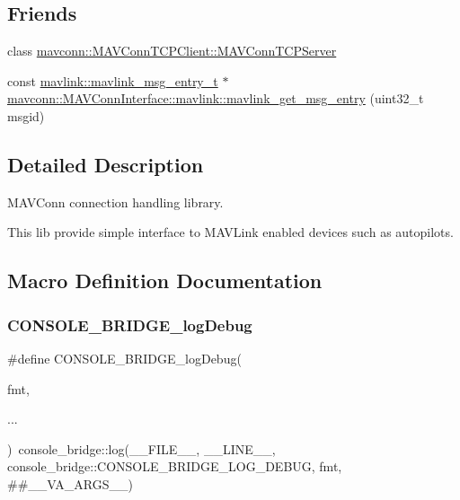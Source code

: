 \subsection*{Friends}
\begin{DoxyCompactItemize}
\item 
class \mbox{\hyperlink{group__mavconn_gaa93ce54993292c6350cf74aa47fde6cd}{mavconn\+::\+M\+A\+V\+Conn\+T\+C\+P\+Client\+::\+M\+A\+V\+Conn\+T\+C\+P\+Server}}
\item 
const \mbox{\hyperlink{include__v2_80_2mavlink__types_8h_abf009bf897407a543e5209298ad82321}{mavlink\+::mavlink\+\_\+msg\+\_\+entry\+\_\+t}} $\ast$ \mbox{\hyperlink{group__mavconn_gabc1b20a1cf82d2e9d432f0a5ac140630}{mavconn\+::\+M\+A\+V\+Conn\+Interface\+::mavlink\+::mavlink\+\_\+get\+\_\+msg\+\_\+entry}} (uint32\+\_\+t msgid)
\end{DoxyCompactItemize}


\subsection{Detailed Description}
M\+A\+V\+Conn connection handling library. 

This lib provide simple interface to M\+A\+V\+Link enabled devices such as autopilots. 

\subsection{Macro Definition Documentation}
\mbox{\label{group__mavconn_gaaf4116dec671bee3f8f1445f6c6a3ebe}} 
\subsubsection{\texorpdfstring{CONSOLE\_BRIDGE\_logDebug}{CONSOLE\_BRIDGE\_logDebug}}
{\footnotesize\ttfamily \#define C\+O\+N\+S\+O\+L\+E\+\_\+\+B\+R\+I\+D\+G\+E\+\_\+log\+Debug(\begin{DoxyParamCaption}\item[{}]{fmt,  }\item[{}]{... }\end{DoxyParamCaption})~console\+\_\+bridge\+::log(\+\_\+\+\_\+\+F\+I\+L\+E\+\_\+\+\_\+, \+\_\+\+\_\+\+L\+I\+N\+E\+\_\+\+\_\+, console\+\_\+bridge\+::\+C\+O\+N\+S\+O\+L\+E\+\_\+\+B\+R\+I\+D\+G\+E\+\_\+\+L\+O\+G\+\_\+\+D\+E\+B\+UG, fmt, \#\#\+\_\+\+\_\+\+V\+A\+\_\+\+A\+R\+G\+S\+\_\+\+\_\+)}



